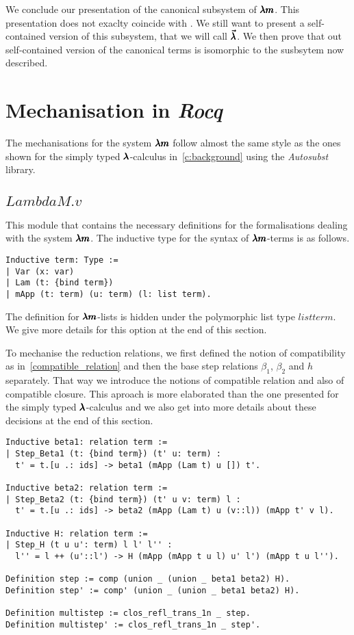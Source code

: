 We conclude our presentation of the canonical subsystem of $\pmb{\lambda m}$.
This presentation does not exaclty coincide with \cite{JCES2002}.
We still want to present a self-contained version of this subsystem, that we will call $\pmb{\vec \lambda}$.
We then prove that out self-contained version of the canonical terms is isomorphic to the susbsytem now described.


\section{Mechanisation in \textit{Rocq}}

The mechanisations for the system $\pmb{\lambda m}$ follow almost the same style as the ones shown for the simply typed $\pmb{\lambda}$-calculus in~\cref{c:background} using the \textit{Autosubst} library.

\subsection{\lst$LambdaM.v$}

This module that contains the necessary definitions for the formalisations dealing with the system $\pmb{\lambda m}$.
The inductive type for the syntax of $\pmb{\lambda m}$-terms is as follows.
\begin{lstlisting}[language=Coq]
Inductive term: Type :=
| Var (x: var)
| Lam (t: {bind term})
| mApp (t: term) (u: term) (l: list term).
\end{lstlisting}

The definition for $\pmb{\lambda m}$-lists is hidden under the polymorphic list type \lst$list term$.
We give more details for this option at the end of this section.

To mechanise the reduction relations, we first defined the notion of compatibility as in~\cref{compatible_relation} and then the base step relations $\beta_1$, $\beta_2$ and $h$ separately.
That way we introduce the notions of compatible relation and also of compatible closure.
This aproach is more elaborated than the one presented for the simply typed $\pmb{\lambda}$-calculus and we also get into more details about these decisions at the end of this section.

\begin{lstlisting}[language=Coq]
Inductive beta1: relation term :=
| Step_Beta1 (t: {bind term}) (t' u: term) :
  t' = t.[u .: ids] -> beta1 (mApp (Lam t) u []) t'.

Inductive beta2: relation term :=
| Step_Beta2 (t: {bind term}) (t' u v: term) l :
  t' = t.[u .: ids] -> beta2 (mApp (Lam t) u (v::l)) (mApp t' v l).

Inductive H: relation term :=       
| Step_H (t u u': term) l l' l'' :
  l'' = l ++ (u'::l') -> H (mApp (mApp t u l) u' l') (mApp t u l'').

Definition step := comp (union _ (union _ beta1 beta2) H).
Definition step' := comp' (union _ (union _ beta1 beta2) H).

Definition multistep := clos_refl_trans_1n _ step.
Definition multistep' := clos_refl_trans_1n _ step'.
\end{lstlisting}

